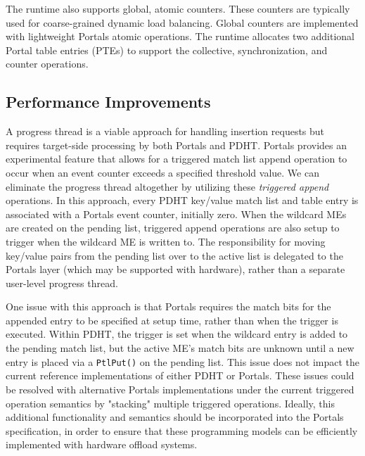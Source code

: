 The runtime also supports global, atomic counters. These counters are typically
used for coarse-grained dynamic load balancing. Global counters are implemented
with lightweight Portals atomic operations. The runtime allocates two
additional Portal table entries (PTEs) to support the collective,
synchronization, and counter operations. 

\subsection{Performance Improvements}
\label{sec:ptl-ext}

{} A progress thread is a viable
approach for handling insertion requests but requires target-side processing
by both Portals and PDHT. Portals provides an experimental feature that allows
for a triggered match list append operation to occur when an event counter
exceeds a specified threshold value. We can eliminate the progress thread
altogether by utilizing these {\em triggered append} operations. In this
approach, every PDHT key/value match list and table entry is associated with a
Portals event counter, initially zero.  When the wildcard MEs are created on
the pending list, triggered append operations are also setup to trigger when
the wildcard ME is written to. The responsibility for moving key/value pairs
from the pending list over to the active list is delegated to the Portals layer
(which may be supported with hardware), rather than a separate user-level
progress thread. 

One issue with this approach is that Portals requires the match bits for the
appended entry to be specified at setup time, rather than when the trigger is
executed. Within PDHT, the trigger is set when the wildcard entry is added to
the pending match list, but the active ME's match bits are unknown until a new
entry is placed via a {\tt PtlPut()} on the pending list. This issue does not
impact the current reference implementations of either PDHT or Portals. These
issues could be resolved with alternative Portals implementations under the
current triggered operation semantics by "stacking" multiple triggered
operations. Ideally, this additional functionality and semantics should be
incorporated into the Portals specification, in order to ensure that these
programming models can be efficiently implemented with hardware offload
systems.\\

